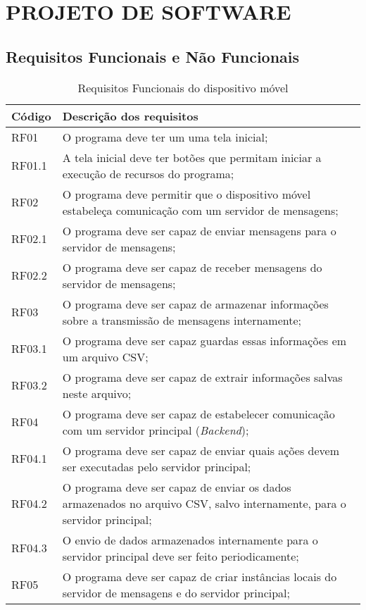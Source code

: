 
\chapter{PROJETO DE SOFTWARE}

\section{\textbf{Requisitos Funcionais e Não Funcionais}}

\begin{table}[htp]
\renewcommand{\arraystretch}{1.3}
\caption{Requisitos Funcionais do dispositivo móvel}
\label{descriçãoSA}
\centering
\begin{tabular}{|p{1.5cm}|p{11cm}|}
\hline
\textbf{Código}  & \textbf{Descrição dos requisitos}\\\hline
RF01 & O programa deve ter um uma tela inicial; \\\hline
RF01.1 & A tela inicial deve ter botões que permitam iniciar a execução de recursos do programa; \\\hline
RF02 & O programa deve permitir que o dispositivo móvel estabeleça comunicação com um servidor de mensagens; \\\hline
RF02.1 & O programa deve ser capaz de enviar mensagens para o servidor de mensagens; \\\hline
RF02.2 & O programa deve ser capaz de receber mensagens do servidor de mensagens; \\\hline
RF03 & O programa deve ser capaz de armazenar informações sobre a transmissão de mensagens internamente;\\\hline
RF03.1 & O programa deve ser capaz guardas essas informações em um arquivo CSV;\\\hline
RF03.2 & O programa deve ser capaz de extrair informações salvas neste arquivo;\\\hline
RF04 & O programa deve ser capaz de estabelecer comunicação com um servidor principal (\textit{Backend});\\\hline 
RF04.1 & O programa deve ser capaz de enviar quais ações devem ser executadas pelo servidor principal;\\\hline 
RF04.2 & O programa deve ser capaz de enviar os dados armazenados no arquivo CSV, salvo internamente, para o servidor principal;\\\hline 
RF04.3 & O envio de dados armazenados internamente para o servidor principal deve ser feito periodicamente;\\\hline 
RF05 & O programa deve ser capaz de criar instâncias locais do servidor de mensagens e do servidor principal; \\\hline
\end{tabular}
\end{table}

